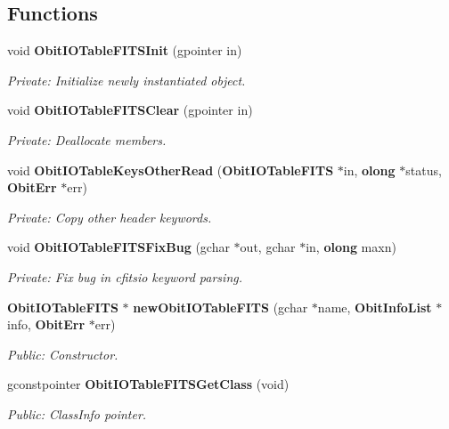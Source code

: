\subsection*{Functions}
\begin{CompactItemize}
\item 
void {\bf Obit\-IOTable\-FITSInit} (gpointer in)
\begin{CompactList}\small\item\em Private: Initialize newly instantiated object. \item\end{CompactList}\item 
void {\bf Obit\-IOTable\-FITSClear} (gpointer in)
\begin{CompactList}\small\item\em Private: Deallocate members. \item\end{CompactList}\item 
void {\bf Obit\-IOTable\-Keys\-Other\-Read} ({\bf Obit\-IOTable\-FITS} $\ast$in, {\bf olong} $\ast$status, {\bf Obit\-Err} $\ast$err)
\begin{CompactList}\small\item\em Private: Copy other header keywords. \item\end{CompactList}\item 
void {\bf Obit\-IOTable\-FITSFix\-Bug} (gchar $\ast$out, gchar $\ast$in, {\bf olong} maxn)
\begin{CompactList}\small\item\em Private: Fix bug in cfitsio keyword parsing. \item\end{CompactList}\item 
{\bf Obit\-IOTable\-FITS} $\ast$ {\bf new\-Obit\-IOTable\-FITS} (gchar $\ast$name, {\bf Obit\-Info\-List} $\ast$info, {\bf Obit\-Err} $\ast$err)
\begin{CompactList}\small\item\em Public: Constructor. \item\end{CompactList}\item 
gconstpointer {\bf Obit\-IOTable\-FITSGet\-Class} (void)
\begin{CompactList}\small\item\em Public: Class\-Info pointer. \item\end{CompactList}\item 

\end{CompactItemize}
